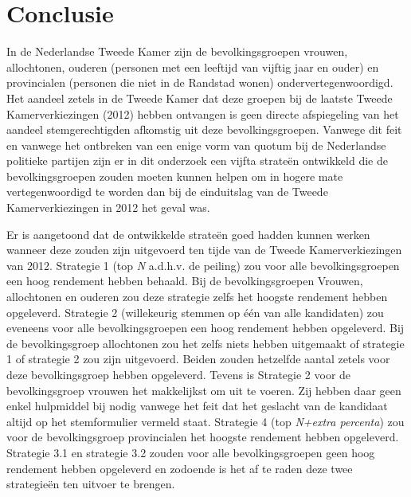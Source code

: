 \newpage
\section{Conclusie}
In de Nederlandse Tweede Kamer zijn de bevolkingsgroepen vrouwen, allochtonen, ouderen (personen met een leeftijd van vijftig jaar en ouder) en provincialen (personen die niet in de Randstad wonen) ondervertegenwoordigd. Het aandeel zetels in de Tweede Kamer dat deze groepen bij de laatste Tweede Kamerverkiezingen (2012) hebben ontvangen is geen directe afspiegeling van het aandeel stemgerechtigden afkomstig uit deze bevolkingsgroepen. Vanwege dit feit en vanwege het ontbreken van een enige vorm van quotum bij de Nederlandse politieke partijen zijn er in dit onderzoek een vijfta strate\"{e}n ontwikkeld die de bevolkingsgroepen zouden moeten kunnen helpen om in hogere mate vertegenwoordigd te worden dan bij de einduitslag van de Tweede Kamerverkiezingen in 2012 het geval was. 

Er is aangetoond dat de ontwikkelde strate\"{e}n goed hadden kunnen werken wanneer deze zouden zijn uitgevoerd ten tijde van de Tweede Kamerverkiezingen van 2012. Strategie 1 (top \textit{N} a.d.h.v. de peiling) zou voor alle bevolkingsgroepen een hoog rendement hebben behaald. Bij de bevolkingsgroepen Vrouwen, allochtonen en ouderen zou deze strategie zelfs het hoogste rendement hebben opgeleverd. Strategie 2 (willekeurig stemmen op één van alle kandidaten) zou eveneens voor alle bevolkingsgroepen een hoog rendement hebben opgeleverd. Bij de bevolkingsgroep allochtonen zou het zelfs niets hebben uitgemaakt of strategie 1 of strategie 2 zou zijn uitgevoerd. Beiden zouden hetzelfde aantal zetels voor deze bevolkingsgroep hebben opgeleverd. Tevens is Strategie 2 voor de bevolkingsgroep vrouwen het makkelijkst om uit te voeren. Zij hebben daar geen enkel hulpmiddel bij nodig vanwege het feit dat het geslacht van de kandidaat altijd op het stemformulier vermeld staat. Strategie 4 (top \textit{N+extra percenta}) zou voor de bevolkingsgroep provincialen het hoogste rendement hebben opgeleverd. Strategie 3.1 en strategie 3.2 zouden voor alle bevolkingsgroepen geen hoog rendement hebben opgeleverd en zodoende is het af te raden deze twee strategie\"{e}n ten uitvoer te brengen.

